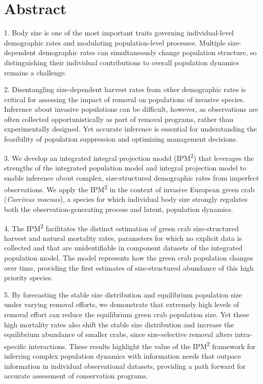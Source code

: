 \documentclass{article}
\begin{document}
\doublespacing

\linenumbers

\section{Abstract}

1.	Body size is one of the most important traits governing individual-level demographic rates and modulating population-level processes. Multiple size-dependent demographic rates can simultaneously change population structure, so distinguishing their individual contributions to overall population dynamics remains a challenge.

2.	Disentangling size-dependent harvest rates from other demographic rates is critical for assessing the impact of removal on populations of invasive species. Inference about invasive populations can be difficult, however, as observations are often collected opportunistically as part of removal programs, rather than experimentally designed. Yet accurate inference is essential for understanding the feasibility of population suppression and optimizing management decisions.

3.	We develop an integrated integral projection model (IPM\textsuperscript{2}) that leverages the strengths of the integrated population model and integral projection model to enable inference about complex, size-structured demographic rates from imperfect observations. We apply the IPM\textsuperscript{2} in the context of invasive European green crab (\textit{Carcinus maenas}), a species for which individual body size strongly regulates both the observation-generating process and latent, population dynamics.

4.	The IPM\textsuperscript{2} facilitates the distinct estimation of green crab size-structured harvest and natural mortality rates, parameters for which no explicit data is collected and that are unidentifiable in component datasets of the integrated population model. The model represents how the green crab population changes over time, providing the first estimates of size-structured abundance of this high priority species. 

5.	By forecasting the stable size distribution and equilibrium population size under varying removal efforts, we demonstrate that extremely high levels of removal effort can reduce the equilibrium green crab population size. Yet these high mortality rates also shift the stable size distribution and increase the equilibrium abundance of smaller crabs, since size-selective removal alters intra-specific interactions. These results highlight the value of the IPM\textsuperscript{2} framework for inferring complex population dynamics with information needs that outpace information in individual observational datasets, providing a path forward for accurate assessment of conservation programs.
\end{document}
